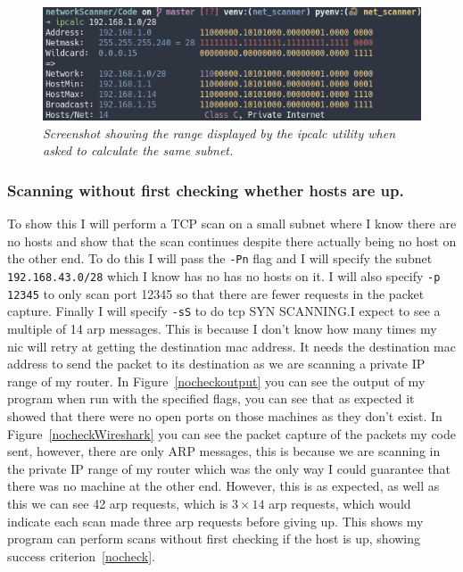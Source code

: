 \documentclass[titlepage]{article}
\let\Oldsubsubsection\subsubsection{}
\renewcommand{\subsubsection}{\FloatBarrier\Oldsubsubsection}
\begin{document}
\begin{figure}[H]
  \centering
  \includegraphics[width=\textwidth]{ipcalclist.png}
  \caption{\textit{%
    Screenshot showing the range displayed by the ipcalc utility when asked to calculate
    the same subnet.
}}\label{cidrwebproof}
\end{figure}

\subsubsection{Scanning without first checking whether hosts are up.}
To show this I will perform a TCP scan on a small subnet where I
know there are no hosts and show that the scan continues despite there actually
being no host on the other end. To do this I will pass the \verb|-Pn| flag
and I will specify the subnet \verb|192.168.43.0/28| which I know has no has no hosts
on it. I will also specify \verb|-p 12345| to only scan port 12345 so that there are
fewer requests in the packet capture. Finally I will specify \verb|-sS| to do \gls{tcp}
SYN SCANNING.\@ I expect to see a multiple of 14 \gls{arp} messages.
This is because I don't know how many times my \gls{nic} will retry at getting
the destination \gls{mac} address. It needs the destination \gls{mac} address to send
the packet to its destination as we are scanning a private IP range of my router.
In Figure~\ref{nocheckoutput} you can see the output of my program when run with the
specified flags, you can see that as expected it showed that there were no open ports
on those machines as they don't exist. In Figure~\ref{nocheckWireshark} you can see the
packet capture of the packets my code sent, however, there are only ARP messages, this is
because we are scanning in the private IP range of my router which was the only
way I could guarantee that there was no machine at the other end. However, this is
as expected, as well as this we can see 42 \gls{arp} requests, which is $3\times14$
\gls{arp} requests, which would indicate each scan made three \gls{arp} requests before
giving up. This shows my program can perform scans without first checking if the host is
up, showing success criterion~\ref{nocheck}.
\end{document}
